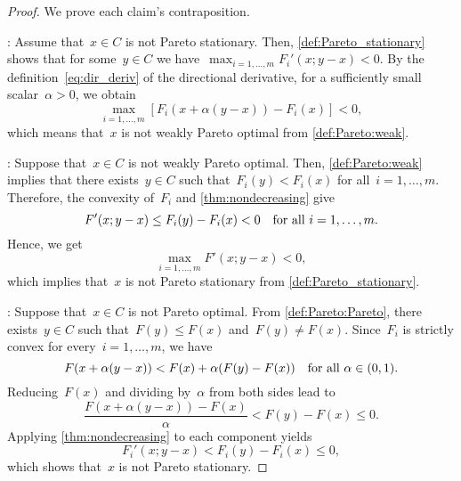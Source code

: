 \documentclass[../main]{subfiles}
\begin{document}
\begin{proof}
    We prove each claim's contraposition.

    :
    Assume that~$x \in C$ is not Pareto stationary.
    Then, \cref{def:Pareto_stationary} shows that for some~$y \in C$ we have~$\max_{i = 1, \dots, m} F_i'(x; y - x) < 0$.
    By the definition~\cref{eq:dir_deriv} of the directional derivative, for a sufficiently small scalar~$\alpha > 0$, we obtain
    \[
        \max_{i = 1, \dots, m} [ F_i(x + \alpha (y - x)) - F_i(x) ] < 0 
    ,\] 
    which means that~$x$ is not weakly Pareto optimal from \cref{def:Pareto:weak}.

    :
    Suppose that~$x \in C$ is not weakly Pareto optimal.
    Then, \cref{def:Pareto:weak} implies that there exists~$y \in C$ such that~$F_i(y) < F_i(x)$ for all~$i = 1, \dots, m$.
    Therefore, the convexity of~$F_i$ and \cref{thm:nondecreasing} give
    \[
        F'(x; y - x) \le F_i(y) - F_i(x) < 0 \quad \text{for all~$i = 1, \dots, m$}
    .\] 
    Hence, we get
    \[
        \max_{i = 1, \dots, m} F'(x; y - x) < 0
    ,\] 
    which implies that~$x$ is not Pareto stationary from \cref{def:Pareto_stationary}.

    :
    Suppose that~$x \in C$ is not Pareto optimal.
    From \cref{def:Pareto:Pareto}, there exists~$y \in C$ such that~$F(y) \le F(x)$ and~$F(y) \neq F(x)$.
    Since~$F_i$ is strictly convex for every~$i = 1, \dots, m$, we have
    \[
        F(x + \alpha(y - x)) < F(x) + \alpha (F(y) - F(x)) \quad \text{for all~$\alpha \in (0, 1)$}
    .\] 
    Reducing~$F(x)$ and dividing by~$\alpha$ from both sides lead to
    \[
        \frac{F(x + \alpha(y - x)) - F(x)}{\alpha} < F(y) - F(x) \le 0
    .\] 
    Applying \cref{thm:nondecreasing} to each component yields
    \[
        F_i'(x; y - x) < F_i(y) - F_i(x) \le 0
    ,\] 
    which shows that~$x$ is not Pareto stationary.
\end{proof}
\end{document}
